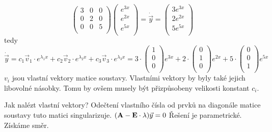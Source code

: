 \[
 \left(
    \begin{array}{ccc}
     3 & 0 & 0\\
     0 & 2 & 0\\
     0 & 0 & 5\\
    \end{array}
  \right)
  \left(
    \begin{array}{l}
     e^{3x}\\
     e^{2x}\\
     e^{5x}\\
    \end{array}
  \right) = 
  \dot{\vec{y}} = 
  \left(
    \begin{array}{l}
     3e^{3x}\\
     2e^{2x}\\
     5e^{5x}\\
    \end{array}
  \right)
\]
tedy
\[
 \dot{\vec{y}} = 
  c_1\vec{v}_1\cdot e^{\lambda_1 x} + c_2\vec{v}_2\cdot e^{\lambda_2 x} + c_3\vec{v}_3\cdot e^{\lambda_3 x} = 
  3\cdot\left(
    \begin{array}{l}
     1\\
     0\\
     0\\
    \end{array}
  \right) e^{3x} +
  2\cdot\left(
    \begin{array}{l}
     0\\
     1\\
     0\\
    \end{array}
  \right) e^{2x} +
  5\cdot\left(
    \begin{array}{c}
     0\\
     0\\
     1\\
    \end{array}
  \right) e^{5x}
\]
$v_i$ jsou vlastní vektory matice soustavy. Vlastními vektory by byly také jejich libovolné násobky. Tomu by ovšem musely být přizpůsobeny velikosti konstant $c_i$.

Jak nalézt vlastní vektory?\newline
Odečtení vlastního čísla od prvků na diagonále matice soustavy tuto matici singularizuje. $({\bf A} - {\bf E}\cdot \lambda)\vec{y} = 0$ Řešení je parametrické. Získáme směr.

